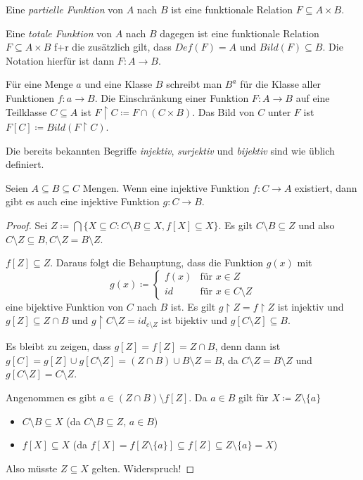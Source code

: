 \begin{definition}
	Eine \textit{partielle Funktion} von $A$ nach $B$ ist eine funktionale Relation $F\subseteq A\times B$.
	
	Eine \textit{totale Funktion} von $A$ nach $B$ dagegen ist eine funktionale Relation $F\subseteq A\times B$ f+r die zusätzlich gilt, dass $Def(F)=A$ und $Bild(F)\subseteq B$. Die Notation hierfür ist dann $F:A \to B$.
\end{definition}

Für eine Menge $a$ und eine Klasse $B$ schreibt man $B^a$ für die Klasse aller Funktionen $f:a\to B$. Die Einschränkung einer Funktion $F: A\to B$ auf eine Teilklasse $C\subseteq A$ ist $F\upharpoonright C\coloneqq F\cap(C\times B)$. Das Bild von $C$ unter $F$ ist $F[C]\coloneqq Bild(F\upharpoonright C)$.

Die bereits bekannten Begriffe \textit{injektiv}, \textit{surjektiv} und \textit{bijektiv} sind wie üblich definiert.

\begin{lemma}
	Seien $A\subseteq B \subseteq C$ Mengen. Wenn eine injektive Funktion $f:C\to A$ existiert, dann gibt es auch eine injektive Funktion $g:C\to B$.
	\label{CursedGeschachtelteMengenFunktionenLemma}
\end{lemma}
\begin{proof}
	Sei $Z\coloneqq \bigcap \{X\subseteq C : C\setminus B\subseteq X, f[X]\subseteq X\}$. Es gilt $C\setminus B\subseteq Z$ und also $C\setminus Z\subseteq B, C\setminus Z = B\setminus Z$.
	
	$f[Z]\subseteq Z$. Daraus folgt die Behauptung, dass die Funktion $g(x)$ mit $$g(x)\coloneqq\begin{cases} f(x) & \text{für } x \in Z \\id & \text{für } x \in C \setminus Z \end{cases}$$
	eine bijektive Funktion von $C$ nach $B$ ist. Es gilt $g \upharpoonright Z=f\upharpoonright Z$ ist injektiv und $g[Z]\subseteq Z \cap B$ und $g \upharpoonright C \setminus Z = id_{c\setminus Z}$ ist bijektiv und $g[C\setminus Z] \subseteq B$.
	
	Es bleibt zu zeigen, dass $g[Z]=f[Z]=Z\cap B$, denn dann ist $g[C]=g[Z]\cup g[C\setminus Z]=(Z\cap B)\cup B\setminus Z=B$, da $C\setminus Z = B \setminus Z$ und $g[C\setminus Z]=C\setminus Z$.
	
	Angenommen es gibt $a\in (Z\cap B)\setminus f[Z]$. Da $a\in B$ gilt für $X\coloneqq Z \setminus \{a\}$
	\begin{itemize}
		\item $C\setminus B\subseteq X$ (da $C\setminus B \subseteq Z$, $a\in B$)
		\item $f[X]\subseteq X$ (da $f[X]=f[Z\setminus \{a\}]\subseteq f[Z] \subseteq Z\setminus \{a\}=X$)
	\end{itemize}
	Also müsste $Z \subseteq X$ gelten. Widerspruch!
\end{proof}

